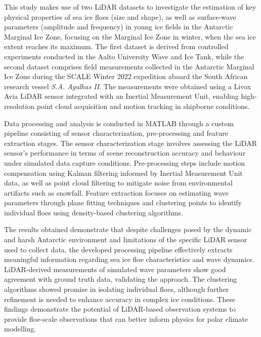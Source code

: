 This study makes use of two LiDAR datasets to investigate the estimation of key physical properties of sea ice floes (size and shape), as well as surface-wave parameters (amplitude and frequency) in young ice fields in the Antarctic Marginal Ice Zone, focusing on the Marginal Ice Zone in winter, when the sea ice extent reaches its maximum. The first dataset is derived from controlled experiments conducted in the Aalto University Wave and Ice Tank, while the second dataset comprises field measurements collected in the Antarctic Marginal Ice Zone during the SCALE Winter 2022 expedition aboard the South African research vessel \textit{S.A. Agulhas II}. The measurements were obtained using a Livox Avia LiDAR sensor integrated with an Inertial Measurement Unit, enabling high-resolution point cloud acquisition and motion tracking in shipborne conditions. 

Data processing and analysis is conducted in MATLAB through a custom pipeline consisting of sensor characterization, pre-processing and feature extraction stages. The sensor characterization stage involves assessing the LiDAR sensor's performance in terms of scene reconstruction accuracy and behaviour under simulated data capture conditions. Pre-processing steps include motion compensation using Kalman filtering informed by Inertial Measurement Unit data, as well as point cloud filtering to mitigate noise from environmental artifacts such as snowfall. Feature extraction focuses on estimating wave parameters through plane fitting techniques and clustering points to identify individual floes using density-based clustering algorithms.

The results obtained demonstrate that despite challenges posed by the dynamic and harsh Antarctic environment and limitations of the specific LiDAR sensor used to collect data, the developed processing pipeline effectively extracts meaningful information regarding sea ice floe characteristics and wave dynamics. LiDAR-derived measurements of simulated wave parameters show good agreement with ground truth data, validating the approach. The clustering algorithms showed promise in isolating individual floes, although further refinement is needed to enhance accuracy in complex ice conditions. These findings demonstrate the potential of LiDAR-based observation systems to provide floe-scale observations that can better inform physics for polar climate modelling.

